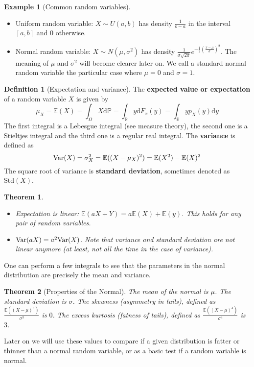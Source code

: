 \documentclass{article}
\numberwithin{equation}{section}
\newtheorem{theorem}{Theorem}[section]
\theoremstyle{definition}
\newtheorem{definition}{Definition}[section]
\newtheorem{example}{Example}[theorem]
\newcommand{\R}{\mathbb{R}}
\newcommand{\pr}{\mathbb{P}}
\newcommand{\E}{\mathbb{E}}
\newcommand{\V}{\textup{Var}}
\newcommand{\dm}{\mathrm{d}}
\begin{document}
\begin{example}[Common random variables]
    \begin{itemize}
        \item Uniform random variable: $X \sim U(a,b)$ has density $\frac{1}{b-a}$ in the interval $[a,b]$ and $0$ otherwise.
        \item Normal random variable: $X \sim N(\mu, \sigma^2)$ has density $\frac{1}{\sigma \sqrt{2\pi}} e^{-\frac 12 (\frac{x - \mu}{\sigma})^2}$. The meaning of $\mu$ and $\sigma^2$ will become clearer later on. We call a standard normal random variable the particular case where $\mu = 0$ and $\sigma=1$.
    \end{itemize}
\end{example}
\begin{definition}[Expectation and variance]
    The \textbf{expected value or expectation} of a random variable $X$ is given by
    \begin{equation}
        \mu_X = \E(X) = \int_{\Omega} X \dm \pr = \int_{\R} y \dm F_x(y) = \int_{\R} y p_X(y) \dm y
    \end{equation}
    The first integral is a Lebesgue integral (see measure theory), the second one is a Stieltjes integral and the third one is a regular real integral.
    The \textbf{variance} is defined as
    \begin{equation}
        \V(X) = \sigma_X^2 = \E((X-\mu_X)^2) = \E(X^2) - \E(X)^2
    \end{equation}
    The square root of variance is \textbf{standard deviation}, sometimes denoted as $\text{Std}(X)$.
\end{definition}
\begin{theorem}
    \begin{itemize}
        \item Expectation is linear: $\E(aX+Y) = a\E(X) + \E(y)$. This holds for any pair of random variables.
        \item $\V(aX) = a^2 \V(X)$. Note that variance and standard deviation are not linear anymore (at least, not all the time in the case of variance).
    \end{itemize}
\end{theorem}
One can perform a few integrals to see that the parameters in the normal distribution are precisely the mean and variance.
\begin{theorem}[Properties of the Normal]
    The mean of the normal is $\mu$. The standard deviation is $\sigma$. The skewness (asymmetry in tails), defined as $\frac{\E((X-\mu)^3)}{\sigma^3}$ is $0$. The excess kurtosis (fatness of tails), defined as $\frac{\E((X-\mu)^4)}{\sigma^4}$ is $3$.
\end{theorem}
Later on we will use these values to compare if a given distribution is fatter or thinner than a normal random variable, or as a basic test if a random variable is normal.
\end{document}
